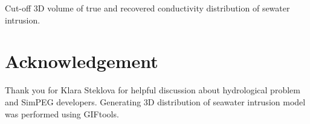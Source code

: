\documentclass{segabs}
\begin{document}
{Cut-off 3D volume of true and recovered conductivity distribution of sewater intrusion.}





\section{Acknowledgement}
Thank you for Klara Steklova for helpful discussion about hydrological problem and  SimPEG developers. Generating 3D distribution of seawater intrusion model was performed using GIFtools. 

\twocolumn
\onecolumn
% 

\end{document}
